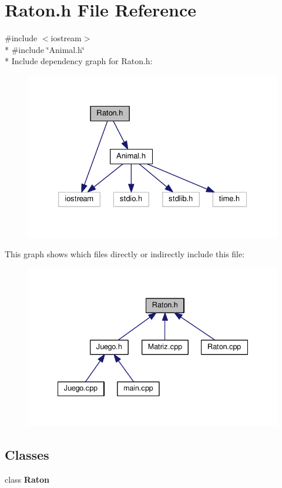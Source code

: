 \section{Raton.\-h File Reference}
\label{_raton_8h}
{\ttfamily \#include $<$iostream$>$}\\*
{\ttfamily \#include \char`\"{}Animal.\-h\char`\"{}}\\*
Include dependency graph for Raton.\-h\-:
\nopagebreak
\begin{figure}[H]
\begin{center}
\leavevmode
\includegraphics[width=326pt]{_raton_8h__incl}
\end{center}
\end{figure}
This graph shows which files directly or indirectly include this file\-:
\nopagebreak
\begin{figure}[H]
\begin{center}
\leavevmode
\includegraphics[width=335pt]{_raton_8h__dep__incl}
\end{center}
\end{figure}
\subsection*{Classes}
\begin{DoxyCompactItemize}
\item 
class {\bf Raton}
\end{DoxyCompactItemize}
